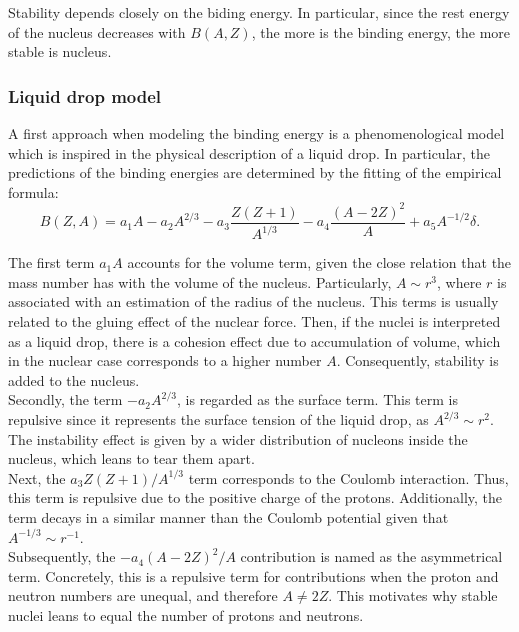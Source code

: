 \documentclass[openany]{book}
\begin{document}
Stability depends closely on the biding energy. In particular, since the rest energy of the nucleus decreases with $B(A, Z)$, the more is the binding energy, the more stable is nucleus.

\subsubsection{Liquid drop model} \label{ssub:liquidDropModel}

A first approach when modeling the binding energy is a phenomenological model which is inspired in the physical description of a liquid drop. In particular, the predictions of the binding energies are determined by the fitting of the empirical formula: \\ 

\begin{equation} \label{eq:liquidDrop_bindingEnergy}
	B(Z,A )= a_1A - a_2A^{2/3} - a_3 \frac{Z(Z+1)}{A^{1/3}} - a_4 \frac{(A - 2Z)^2}{A}   +   a_5 A^{-1/2} \delta.
\end{equation}

The first term $a_1A$ accounts for the volume term, given the close relation that the mass number has with the volume of the nucleus. Particularly, $A \sim r^3$, where $r$ is associated with an estimation of the radius of the nucleus. This terms is usually related to the gluing effect of the nuclear force. Then, if the nuclei is interpreted as a liquid drop, there is a cohesion effect due to accumulation of volume, which in the nuclear case corresponds to a higher number $A$. Consequently, stability is added to the nucleus.   \\

Secondly, the term $- a_2A^{2/3} $, is regarded as the surface term. This term is repulsive since it represents the surface tension of the liquid drop, as $A^{2/3}  \sim r^2$. The instability effect is given by a wider distribution of nucleons inside the nucleus, which leans to tear them apart. \\

Next, the $ a_3 Z(Z+1)/A^{1/3}$ term corresponds to the Coulomb interaction. Thus, this term is repulsive due to the positive charge of the protons. Additionally, the term decays in a similar manner than the Coulomb potential given that $A^{-1/3} \sim r^{-1}$. \\

Subsequently, the $ -a_4 (A - 2Z)^2/A$ contribution is named as the asymmetrical term. Concretely, this is a repulsive term for contributions when the proton and neutron numbers are unequal, and therefore $A \neq 2Z$. This motivates why stable nuclei leans to equal the number of protons and neutrons.\\ 
\end{document}
